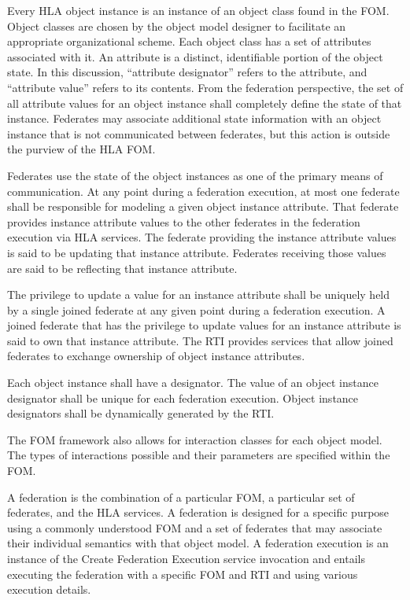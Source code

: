 \clearpage
Every HLA object instance is an instance of an object class found in the FOM. Object classes are chosen by the object model designer to facilitate an appropriate organizational scheme. Each object class has a set of attributes associated with it. An attribute is a distinct, identifiable portion of the object state. In this discussion, ``attribute designator'' refers to the attribute, and ``attribute value'' refers to its contents. From the federation perspective, the set of all attribute values for an object instance shall completely define the state of that instance. Federates may associate additional state information with an object instance that is not communicated between federates, but this action is outside the purview of the HLA FOM.

Federates use the state of the object instances as one of the primary means of communication. At any point during a federation execution, at most one federate shall be responsible for modeling a given object instance attribute. That federate provides instance attribute values to the other federates in the federation execution via HLA services. The federate providing the instance attribute values is said to be updating that instance attribute. Federates receiving those values are said to be reflecting that instance attribute.

The privilege to update a value for an instance attribute shall be uniquely held by a single joined federate at any given point during a federation execution. A joined federate that has the privilege to update values for an instance attribute is said to own that instance attribute. The RTI provides services that allow joined federates to exchange ownership of object instance attributes.

Each object instance shall have a designator. The value of an object instance designator shall be unique for each federation execution. Object instance designators shall be dynamically generated by the RTI.

The FOM framework also allows for interaction classes for each object model. The types of interactions possible and their parameters are specified within the FOM.

A federation is the combination of a particular FOM, a particular set of federates, and the HLA services. A federation is designed for a specific purpose using a commonly understood FOM and a set of federates that may associate their individual semantics with that object model. A federation execution is an instance of the Create Federation Execution service invocation and entails executing the federation with a specific FOM and RTI and using various execution details.

